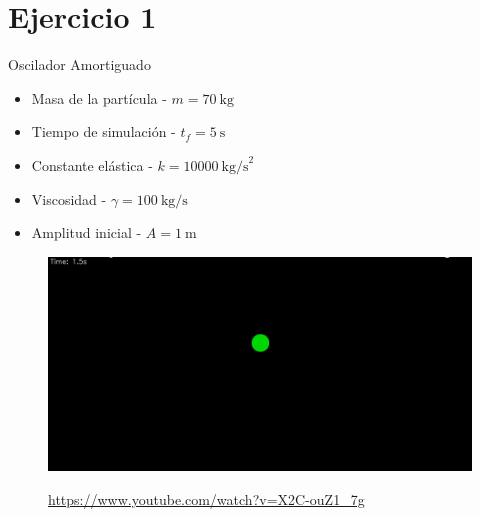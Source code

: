\section{Ejercicio 1}\label{sec:ejercicio1}

\begin{frame}{Oscilador Amortiguado}
    \begin{multicols}{2}
        {
        \begin{itemize}
            \item Masa de la partícula - $m = 70\ \text{kg}$
            \item Tiempo de simulación - $t_f = 5\ \text{s}$
            \item Constante elástica - $k = 10000\ \text{kg/s}^2$
            \item Viscosidad - $\gamma = 100\ \text{kg/s}$
            \item Amplitud inicial - $A = 1\ \text{m}$
        \end{itemize}
        }
        {
        \begin{figure}[H]
            \centering
            \includegraphics[width=1\linewidth]{pic/00-ejercicio1/thumbnail}\\
            \captionsetup{labelformat=empty}
            \caption{\href{https://www.youtube.com/watch?v=X2C-ouZ1_7g}{https://www.youtube.com/watch?v=X2C-ouZ1\_7g}}
            \label{fig:oscilador_amortiguado_animation}
        \end{figure}
        }
    \end{multicols}
\end{frame}


